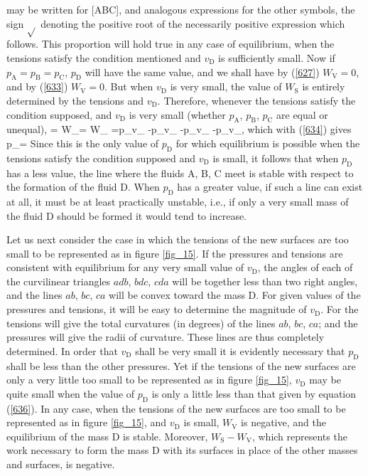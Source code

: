 \documentclass[12pt]{article}
\begin{document}
may be written for [ABC], and analogous expressions for the other symbols, the sign $\sqrt{}$ denoting the positive root of the necessarily positive expression which follows. This proportion will hold true in any case of equilibrium, when the tensions satisfy the condition mentioned and $v_\text{D}$ is sufficiently small. Now if $p_\text{A}=p_\text{B}=p_\text{C}$, $p_\text{D}$ will have the same value, and we shall have by (\ref{627}) $W_\text{V}=0$, and by (\ref{633}) $W_\text{V} =0$. But when $v_\text{D}$ is very small, the value of $W_\text{S}$ is entirely determined by the tensions and $v_\text{D}$. Therefore, whenever the tensions satisfy the condition supposed, and $v_\text{D}$ is very small (whether $p_\text{A}$, $p_\text{B}$, $p_\text{C}$ are equal or unequal),
 = W_= W_ =p_v_ -p_v_ -p_v_ -p_v_,          \label{634} \eqe
which with (\ref{634}) gives
\eqs p_=\label{635} \eqe
Since this is the only value of $p_\text{D}$ for which equilibrium is possible when the tensions satisfy the condition supposed and $v_\text{D}$ is small, it follows that when $p_\text{D}$ has a less value, the line where the fluids A, B, C meet is stable with respect to the formation of the fluid D. When $p_\text{D}$ has a greater value, if such a line can exist at all, it must be at least practically unstable, i.e., if only a very small mass of the fluid D should be formed it would tend to increase.

Let us next consider the case in which the tensions of the new surfaces are too small to be represented as in figure \ref{fig_15}. If the pressures and tensions are consistent with equilibrium for any very small value of $v_\text{D}$, the angles of each of the curvilinear triangles $adb$, $bdc$, $cda$ will be together less than two right angles, and the lines $ab$, $bc$, $ca$ will be convex toward the mass D. For given values of the pressures and tensions, it will be easy to determine the magnitude of $v_\text{D}$. For the tensions will give the total curvatures (in degrees) of the lines $ab$, $bc$, $ca$; and the pressures will give the radii of curvature. These lines are thus completely determined. In order that $v_\text{D}$ shall be very small it is evidently necessary that $p_\text{D}$ shall be less than the other pressures. Yet if the tensions of the new surfaces are only a very little too small to be represented as in figure \ref{fig_15}, $v_\text{D}$ may be quite small when the value of $p_\text{D}$ is only a little less than that given by equation (\ref{636}). In any case, when the tensions of the new surfaces are too small to be represented as in figure \ref{fig_15}, and $v_\text{D}$ is small, $W_\text{V}$ is negative, and the equilibrium of the mass D is stable. Moreover, $W_\text{S}-W_\text{V}$, which represents the work necessary to form the mass D with its surfaces in place of the other masses and surfaces, is negative.
\end{document}
